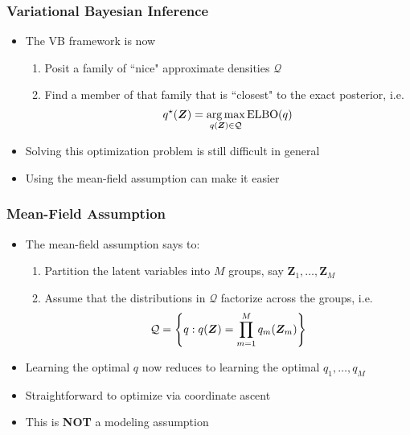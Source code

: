 \documentclass[10pt, compress, notheorems, aspectratio=169]{beamer}
\let\originalleft\left
\let\originalright\right
\renewcommand{\left}{\mathopen{}\mathclose \bgroup \originalleft}
\renewcommand{\right}{\aftergroup \egroup \originalright}
\DeclareMathOperator*{\argmax}{arg\,max}
\begin{document}
\begin{frame}
	\frametitle{Variational Bayesian Inference}
	\begin{itemize}
		\item The VB framework is now
			\begin{enumerate}
				\item Posit a family of ``nice" approximate densities $\mathcal Q$
				\item Find a member of that family that is ``closest" to the exact posterior, i.e.
				\begin{equation}
					q^{\star} \left( {\bm Z} \right) = \argmax_{q \left( {\bm Z} \right) \in \mathcal Q} \text{ELBO} \left( q \right) \label{new.objective}
				\end{equation}
			\end{enumerate}
		\item Solving this optimization problem is still difficult in general
		\item Using the mean-field assumption can make it easier
	\end{itemize}
\end{frame}

\begin{frame}
	\frametitle{Mean-Field Assumption}
	\begin{itemize}
		\item The mean-field assumption says to:
			\begin{enumerate}
				\item Partition the latent variables into $M$ groups, say ${\bm Z}_1, \ldots, {\bm Z}_M$
				\item Assume that the distributions in $\mathcal Q$ factorize across the groups, i.e.
				$$\mathcal Q = \left\{ q : q \left( {\bm Z} \right) = \prod_{m = 1}^M q_m \left( {\bm Z}_m \right) \right\}$$
			\end{enumerate}
		\item Learning the optimal $q$ now reduces to learning the optimal $q_1, \ldots, q_M$
		\item Straightforward to optimize via coordinate ascent
		\item This is \textbf{NOT} a modeling assumption
	\end{itemize}
	
\end{frame}
\end{document}
